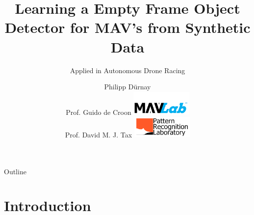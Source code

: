 \documentclass{beamer}
\title{Learning a Empty Frame Object Detector for MAV's from Synthetic Data} %
\subtitle{Applied in Autonomous Drone Racing} %
\author{Philipp Dürnay\\ \bigskip \bigskip Prof. Guido de Croon \hfill	\includegraphics[width=3cm]{fig/mavlab}\\
	 Prof. David M. J. Tax  \hfill \includegraphics[width=3cm]{fig/prgroup}%
}
\begin{document}
  \frame{\maketitle}


  \begin{darkframes}
  	\begin{frame}{Outline}
  		\tableofcontents
  	\end{frame}
	\section{Introduction}

\end{darkframes}
\end{document}
